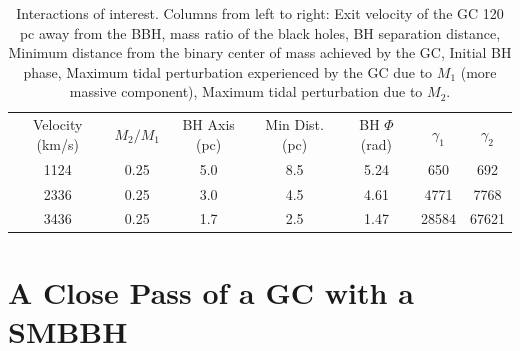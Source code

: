 \documentclass{aastex62}
\begin{document}
\begin{table}
\centering
\caption{Interactions of interest. Columns from left to right: Exit velocity of the GC 120 pc away from the BBH, mass ratio of the black holes, BH separation distance, Minimum distance from the binary center of mass achieved by the GC, Initial BH phase, Maximum tidal perturbation experienced by the GC due to $M_{1}$ (more massive component), Maximum tidal perturbation due to $M_{2}$. \label{results}}

\begin{tabular}{ccccccc}
\hline \hline
Velocity (km/s) & $M_{2}/M_{1}$ & BH Axis (pc) & Min Dist. (pc) & BH $\Phi$ (rad) & $\gamma_{1}$ & $\gamma_{2}$  \\
1124 & 0.25 & 5.0 & 8.5 & 5.24 & 650 & 692 \\
2336 & 0.25 & 3.0 & 4.5 & 4.61 & 4771 & 7768 \\
3436 & 0.25 & 1.7 & 2.5 & 1.47 & 28584 & 67621 \\
\end{tabular}
\end{table}



\section{A Close Pass of a GC with a SMBBH}
\end{document}
